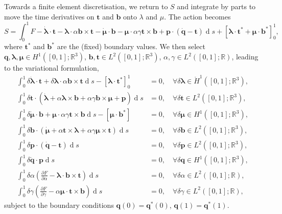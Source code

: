 \documentclass{article}
\def\MM#1{\boldsymbol{#1}}
\newcommand{\pp}[2]{\frac{\partial #1}{\partial #2}}
\def\MM#1{\boldsymbol{#1}}
\DeclareMathOperator{\diff}{d}
\begin{document}
Towards a finite element discretisation, we return to $S$ and integrate
by parts to move the time derivatives on $\MM{t}$ and $\MM{b}$ onto
$\lambda$ and $\mu$. The action becomes
\begin{equation}
  S = \int_0^1 F - \dot{\MM{\lambda}}\cdot\MM{t}
  -\MM{\lambda}\cdot\alpha\MM{b}\times\MM{t}
  - \dot{\MM{\mu}}\cdot\MM{b}
  -\MM{\mu}\cdot\alpha\gamma\MM{t}\times\MM{b}
  + \MM{p}\cdot\left(\dot{\MM{q}}-\MM{t}\right)\diff s
  + \left[\MM{\lambda}\cdot\MM{t}^* + \MM{\mu}\cdot\MM{b}^*
    \right]_0^1,
\end{equation}
where $\MM{t}^*$ and $\MM{b}^*$ are the (fixed) boundary values. We
then select $\MM{q},\MM{\lambda},\MM{\mu}\in H^1([0,1];\mathbb{R}^3)$,
$\MM{b},\MM{t}\in L^2([0,1];\mathbb{R}^3)$, $\alpha,\gamma\in
L^2([0,1];\mathbb{R})$, leading to the variational formulation,
\begin{align}
  \int_0^1 \delta \dot{\MM{\lambda}}\cdot\MM{t}
  +\delta\MM{\lambda}\cdot\alpha\MM{b}\times\MM{t}
  \diff s -
  \left[
    \MM{\lambda}\cdot \MM{t}^*
    \right]_0^1
  & = 0, \quad \forall \delta\MM{\lambda} \in
  \mathring{H}^1([0,1];\mathbb{R}^3), \\
  \int_0^1 \delta \MM{t} \cdot
  \left(\dot{\MM{\lambda}} + \alpha\MM{\lambda}\times \MM{b}
  +\alpha\gamma \MM{b}\times\MM{\mu} + \MM{p}\right)\diff s & = 0,
  \quad \forall \delta\MM{t} \in L^2([0,1];\mathbb{R}^3), \\
  \int_0^1 \delta \dot{\MM{\mu}}\cdot{\MM{b}}
  +\MM{\mu}\cdot\alpha\gamma\MM{t}\times\MM{b}
  \diff s - \left[\MM{\mu}\cdot\MM{b}^*
    \right]& = 0, \quad \forall \delta\MM{\mu} \in
  H^1([0,1];\mathbb{R}^3), \\
  \int_0^1 \delta \MM{b}\cdot \left(\dot{\MM{\mu}}
  +\alpha\MM{t}\times\MM{\lambda}
  +\alpha\gamma\MM{\mu}\times\MM{t}
  \right)\diff s & = 0, \quad \forall \delta\MM{b}\in L^2([0,1];\mathbb{R}^3), \\
  \int_0^1 \delta \MM{p}\cdot \left(\dot{\MM{q}}-\MM{t}\right)\diff s &= 0,
  \quad \forall \delta\MM{p}\in L^2([0,1];\mathbb{R}^3), \\
  \int_0^1 \delta\dot{\MM{q}}\cdot{\MM{p}}\diff s & = 0, \quad
  \forall \delta \MM{q} \in H^1([0,1];\mathbb{R}^3), \\
  \int_0^1 \delta\alpha\left(\pp{F}{\alpha}-\MM{\lambda}\cdot\MM{b}\times
  \MM{t}\right)\diff s & = 0, \quad \forall \delta\alpha\in L^2([0,1];
  \mathbb{R}), \\
  \int_0^1 \delta\gamma\left(\pp{F}{\gamma}-\alpha\MM{\mu}\cdot\MM{t}\times
  \MM{b}\right)\diff s & = 0, \quad \forall \delta\gamma \in L^2([0,1];
  \mathbb{R}),
\end{align}
subject to the boundary conditions $\MM{q}(0)=\MM{q}^*(0)$,
$\MM{q}(1)=\MM{q}^*(1)$.
\end{document}
